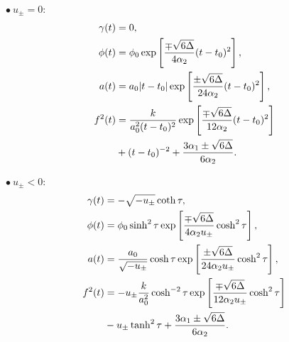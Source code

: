 \documentclass[aps,prd,12pt,superscriptaddress,showpacs,showkeys,longbibliography,reprint,nofootinbib]{revtex4-1}
\begin{document}
$\bullet\ u_\pm=0$:
\begin{align}
  \gamma(t)&=0,\\
  \phi(t)&=\phi_0\exp\left[\frac{\mp\sqrt{6\Delta}}{4\alpha_2}(t-t_0)^2\right],\\
  a(t)&=a_0|t-t_0|\exp\left[\frac{\pm\sqrt{6\Delta}} {24\alpha_2}(t-t_0)^2\right],\\
  f^2(t)&=\frac{k}{a_0^2(t-t_0)^2}\exp\left[\frac{\mp\sqrt{6\Delta}}{12\alpha_2}(t-t_0)^2\right]\notag\\
  &+(t-t_0)^{-2} + \frac{3\alpha_1\pm\sqrt{6\Delta}}{6\alpha_2}.
\end{align}

$\bullet\ u_\pm<0$:
\begin{align}
  \gamma(t)&=-\sqrt{-u_\pm}\coth\tau,\\
  \phi(t)&=\phi_0\sinh^2\tau\exp\left[\frac{\mp\sqrt{6\Delta}}{4\alpha_2u_\pm}\cosh^2\tau\right],\\
  a(t)&=\frac{a_0}{\sqrt{-u_\pm}}\cosh\tau\exp\left[\frac{\pm\sqrt{6\Delta}} {24\alpha_2u_\pm}\cosh^2\tau\right],\\
  f^2(t)&=-u_\pm\frac{k}{a_0^2}\cosh^{-2}\tau\exp\left[\frac{\mp\sqrt{6\Delta}}{12\alpha_2u_\pm}\cosh^2\tau\right]\notag\\
  &-u_\pm\tanh^2\tau + \frac{3\alpha_1\pm\sqrt{6\Delta}}{6\alpha_2}.
\end{align}

\end{document}
